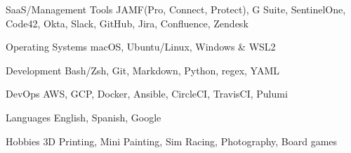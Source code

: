 

\begin{cvskills}


	\cvskill
	{SaaS/Management Tools} %
	{JAMF(Pro, Connect, Protect), G Suite, SentinelOne, Code42, Okta, Slack, GitHub, Jira, Confluence, Zendesk} %

	\cvskill
	{Operating Systems} %
	{macOS, Ubuntu/Linux, Windows \& WSL2} %

	\cvskill
	{Development} %
	{Bash/Zsh, Git, Markdown, Python, regex, YAML} %

	\cvskill
	{DevOps} %
	{AWS, GCP, Docker, Ansible, CircleCI, TravisCI, Pulumi} %

	\cvskill
	{Languages} %
	{English, Spanish, Google} %

	\cvskill
	{Hobbies}
	{3D Printing, Mini Painting, Sim Racing, Photography, Board games}

\end{cvskills}

